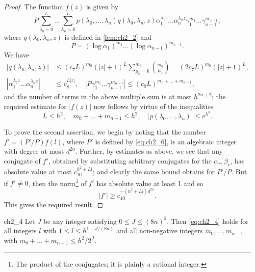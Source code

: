 \begin{proof}
The function $f(z)$ is given by
\[
P \sum_{\lambda_0=0}^L \dots \sum_{\lambda_n=0}^L p(\lambda_0, \dots, \lambda_n) q(\lambda_0, \lambda_n, z) \alpha_1^{\lambda_1 z} \dots \alpha_n^{\lambda_n z} \gamma_1^{m_1} \dots \gamma_{n-1}^{m_{n-1}},
\]
where $q(\lambda_0, \lambda_n, z)$ is defined in \autoref{lem:ch2_2} and
\[
P = (\log \alpha_1)^{m_1} \dots (\log \alpha_{n-1})^{m_{n-1}}.
\]
We have
\begin{align*}
|q(\lambda_0, \lambda_n, z)| &\le (c_7 L)^{m_0} (|z| + 1)^L \sum_{\mu_0=0}^{m_0} \binom{m_0}{\mu_0} = (2c_7 L)^{m_0} (|z| + 1)^L, \\
\left|\alpha_1^{\lambda_1 z} \dots \alpha_n^{\lambda_n z}\right| &\le c_8^{L|z|}, \quad \left|P \gamma_1^{m_1} \dots \gamma_{n-1}^{m_{n-1}}\right| \le (c_9 L)^{m_1+\dots+m_{n-1}},
\end{align*}
and the number of terms in the above multiple sum is at most $h^{2n+2}$; the required estimate for $|f(z)|$ now follows by virtue of the inequalities
\[
L \le h^2, \quad m_0 + \dots + m_{n-1} \le h^2, \quad |p(\lambda_0, \dots, \lambda_n)| \le e^{h^3}.
\]

To prove the second assertion, we begin by noting that the number $f' = (P'/P)f(l)$, where $P'$ is defined by \eqref{eq:ch2_6}, is an algebraic integer with degree at most $d^{2n}$. Further, by estimates as above, we see that any conjugate of $f'$, obtained by substituting arbitrary conjugates for the $\alpha_r, \beta_r$, has absolute value at most $c_{10}^{h^2+Ll}$; and clearly the same bound obtains for $P'/P$. But if $f' \neq 0$, then the norm\footnote{The product of the conjugates; it is plainly a rational integer.} of $f'$ has absolute value at least $1$ and so
\[
|f'| \ge c_{10}^{-(h^2+Ll)d^{2n}}.
\]
This gives the required result.
\end{proof}

\begin{mylemma}{}{ch2_4}
Let $J$ be any integer satisfying $0 \le J \le (8n)^2$. Then \eqref{eq:ch2_4} holds for all integers $l$ with $1 \le l \le h^{1+J/(8n)}$ and all non-negative integers $m_0, \dots, m_{n-1}$ with $m_0 + \dots + m_{n-1} \le h^2/2^J$.
\end{mylemma}

